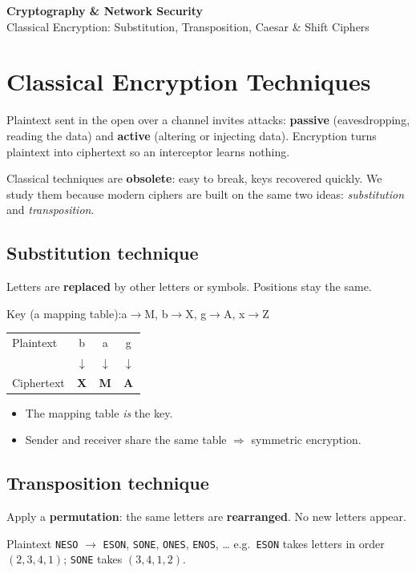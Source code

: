 \documentclass[10pt,a4paper]{article}
\newcommand{\ttx}[1]{\texttt{#1}}
\begin{document}
\begin{center}
{\LARGE\bfseries Cryptography \& Network Security}\\[2pt]
{\large Classical Encryption: Substitution, Transposition, Caesar \& Shift Ciphers}
\end{center}

\section{Classical Encryption Techniques}

Plaintext sent in the open over a channel invites attacks:
\textbf{passive} (eavesdropping, reading the data) and \textbf{active} (altering or injecting data).
Encryption turns plaintext into ciphertext so an interceptor learns nothing.

Classical techniques are \textbf{obsolete}: easy to break, keys recovered quickly. We study them because modern ciphers are built on the same two ideas: \emph{substitution} and \emph{transposition}.

\subsection{Substitution technique}
\begin{keybox}
Letters are \textbf{replaced} by other letters or symbols. Positions stay the same.
\end{keybox}
\begin{minipage}[t]{0.48\textwidth}
Key (a mapping table):\quad a$\to$M,\; b$\to$X,\; g$\to$A,\; x$\to$Z\\[3pt]
\begin{tabular}{@{}lccc@{}}
Plaintext  & b & a & g \\
           & $\downarrow$ & $\downarrow$ & $\downarrow$ \\
Ciphertext & \textbf{X} & \textbf{M} & \textbf{A}
\end{tabular}
\end{minipage}\hfill
\begin{minipage}[t]{0.48\textwidth}
\begin{itemize}
  \item The mapping table \emph{is} the key.
  \item Sender and receiver share the same table $\Rightarrow$ symmetric encryption.
\end{itemize}
\end{minipage}

\subsection{Transposition technique}
\begin{keybox}
Apply a \textbf{permutation}: the same letters are \textbf{rearranged}. No new letters appear.
\end{keybox}
Plaintext \ttx{NESO} $\to$ \ttx{ESON}, \ttx{SONE}, \ttx{ONES}, \ttx{ENOS}, \dots
\quad e.g.\ \ttx{ESON} takes letters in order $(2,3,4,1)$; \ttx{SONE} takes $(3,4,1,2)$.
\end{document}
